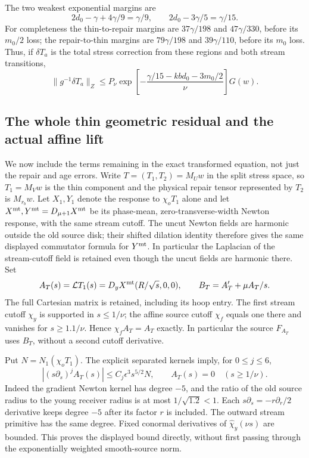 The two weakest exponential margins are
\[
 2d_0-\gamma+4\gamma/9=\gamma/9,
 \qquad 2d_0-3\gamma/5=\gamma/15.
\]
For completeness the thin-to-repair margins are
$37\gamma/198$ and $47\gamma/330$, before its $m_0/2$ loss;
the repair-to-thin margins are $79\gamma/198$ and
$39\gamma/110$, before its $m_0$ loss. Thus, if $\delta T_a$
is the total stress correction from these regions and both stream
transitions,
\begin{equation}\label{repair:age-error}
 \|g^{-1}\delta T_a\|_Z
 \le P_\nu
  \exp\!\left[-\frac{\gamma/15-kbd_0-3m_0/2}{\nu}\right]G(w).
\end{equation}

\subsection{The whole thin geometric residual and the actual affine lift}

We now include the terms remaining in the exact transformed equation,
not just the repair and age errors. Write $T=(T_1,T_2)=M_Uw$ in
the split stress space, so $T_1=M_Vw$ is the thin component and the
physical repair tensor represented by $T_2$ is $M_{r_b}w$.
Let $X_1,Y_1$ denote the response to $\chi_oT_1$ alone and let
$X^{\rm mt},Y^{\rm mt}=D_{\mu+1}X^{\rm mt}$ be its phase-mean,
zero-transverse-width Newton response, with the same stream cutoff.
The uncut Newton fields are harmonic outside the old source disk;
their shifted dilation identity therefore gives the same displayed
commutator formula for $Y^{\rm mt}$. In particular the Laplacian
of the stream-cutoff field is retained even though the uncut fields
are harmonic there.
Set
\[
 A_T(s)=\mathcal L T_1(s)
       =D_yX^{\rm mt}(R/\sqrt s,0,0),\qquad
 B_T=A_T'+\mu A_T/s.
\]
The full Cartesian matrix is retained, including its hoop entry.
The first stream cutoff $\chi_y$ is supported in $s\le1/\nu$;
the affine source cutoff $\chi_f$ equals one there and vanishes for
$s\ge1.1/\nu$. Hence $\chi_f A_T=A_T$ exactly. In particular the
source $F_{A_T}$ uses $B_T$, without a second cutoff derivative.

Put $N=N_1(\chi_oT_1)$. The explicit separated kernels imply,
for $0\le j\le6$,
\begin{equation}\label{repair:actual-jet}
 |(s\partial_s)^j A_T(s)|\le C_j\epsilon^3s^{5/2}N,
 \qquad A_T(s)=0\quad(s\ge1/\nu).
\end{equation}
Indeed the gradient Newton kernel has degree $-5$, and the ratio of
the old source radius to the young receiver radius is at most
$1/\sqrt{1.2}<1$. Each $s\partial_s=-r\partial_r/2$ derivative
keeps degree $-5$ after its factor $r$ is included. The outward
stream primitive has the same degree. Fixed conormal derivatives
of $\widehat\chi_y(\nu s)$ are bounded. This proves the displayed
bound directly, without first passing through the exponentially
weighted smooth-source norm.

